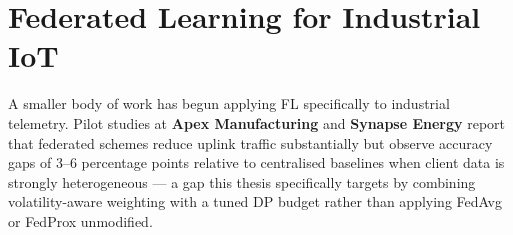 \section{Federated Learning for Industrial IoT}
A smaller body of work has begun applying FL specifically to industrial telemetry.
Pilot studies at \textbf{Apex Manufacturing} and \textbf{Synapse Energy} report that
federated schemes reduce uplink traffic substantially but observe accuracy gaps of
3--6 percentage points relative to centralised baselines when client data is strongly
heterogeneous — a gap this thesis specifically targets by combining volatility-aware
weighting with a tuned DP budget rather than applying FedAvg or FedProx unmodified.
